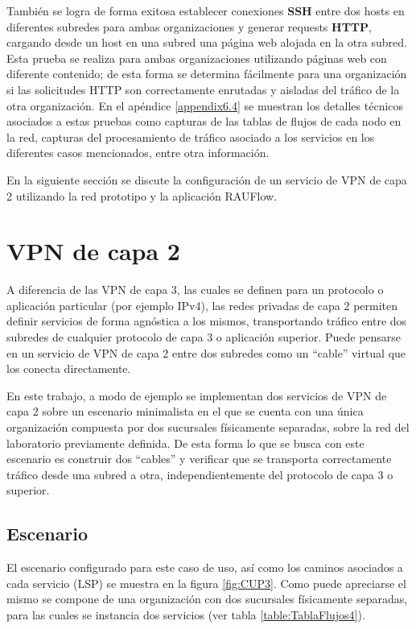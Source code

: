 Tambi\'en se logra de forma exitosa establecer conexiones \textbf{SSH} entre dos hosts en diferentes subredes para ambas organizaciones y generar requests \textbf{HTTP}, cargando desde un host en una subred una p\'agina web alojada en la otra subred. Esta prueba se realiza para ambas organizaciones utilizando p\'aginas web con diferente contenido; de esta forma se determina fácilmente para una organización si las solicitudes HTTP son correctamente enrutadas y aisladas del tr\'afico de la otra organizaci\'on. En el apéndice \ref{appendix6.4} se muestran los detalles t\'ecnicos asociados a estas pruebas como capturas de las tablas de flujos de cada nodo en la red, capturas del procesamiento de tr\'afico asociado a los servicios en los diferentes casos mencionados, entre otra informaci\'on.

En la siguiente secci\'on se discute la configuraci\'on de un servicio de VPN de capa 2 utilizando la red prototipo y la aplicaci\'on RAUFlow.

\section{VPN de capa 2}

A diferencia de las VPN de capa 3, las cuales se definen para un protocolo o aplicaci\'on particular  
 (por ejemplo IPv4), las redes privadas de capa 2 permiten definir servicios de forma agnóstica a los mismos, transportando tr\'afico entre dos subredes de cualquier protocolo de capa 3 o aplicación superior. Puede pensarse en un servicio de VPN de capa 2 entre dos subredes como un “cable” virtual que los conecta directamente.

En este trabajo, a modo de ejemplo se implementan dos servicios de VPN de capa 2 sobre un escenario minimalista en el que se cuenta con una \'unica organización compuesta por dos sucursales físicamente separadas, sobre la red del laboratorio previamente definida. De esta forma lo que se busca con este escenario es construir dos “cables” y verificar que se transporta correctamente tr\'afico desde una subred a otra, independientemente del protocolo de capa 3 o superior.

\subsection{Escenario}
El escenario configurado para este caso de uso, as\'i como los caminos asociados a cada servicio (LSP) se muestra en la figura \ref{fig:CUP3}. Como puede apreciarse el mismo se compone de una organización con dos sucursales físicamente separadas, para las cuales se instancia dos servicios (ver tabla \ref{table:TablaFlujos4}). 

